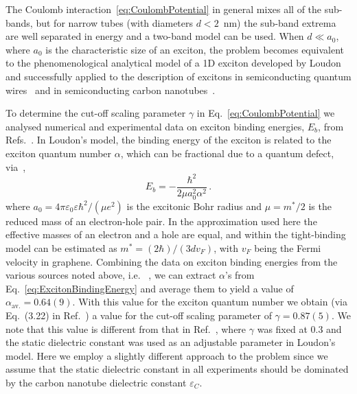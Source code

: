 \documentclass[journal=aamick,manuscript=article]{achemso}
\begin{document}
The Coulomb interaction~\eqref{eq:CoulombPotential} in general mixes all of the sub-bands, but for narrow tubes (with diameters $d<2$~nm) the sub-band extrema are well separated in energy and a two-band model can be used. When $ d \ll a_0$, where $a_0$ is the characteristic size of an exciton, the problem becomes equivalent to the phenomenological analytical model of a 1D exciton developed by Loudon~\cite{Loudon1959} and successfully applied to the description of excitons in semiconducting quantum wires~\cite{Banyai1987,Ogawa1991,Ogawa1991a} and in semiconducting carbon nanotubes~\cite{Wang2005}.

To determine the cut-off scaling parameter $\gamma$ in Eq.~\eqref{eq:CoulombPotential} we analysed numerical and experimental data on exciton binding energies, $E_b$, from Refs.~\cite{Zhao2004,Chang2004,Maultzsch2005,Pedersen2003}.
In Loudon's model, the binding energy of the exciton is related to the exciton quantum number $\alpha$, which can be fractional due to a quantum defect, via~\cite{Loudon1959},
%
\begin{equation}
\label{eq:ExcitonBindingEnergy}
    E_b =  -\dfrac{\hbar^2}{2 \mu a_0^2 \alpha^2} \, .
\end{equation}
%
where $a_0 =  4 \pi \varepsilon_0 \varepsilon \hbar^2/(\mu e^2)$ is the excitonic Bohr radius and $\mu=m^{\ast}/2$ is the reduced mass of an electron-hole pair.
In the approximation used here the effective masses of an electron and a hole are equal, and within the tight-binding model can be estimated as  $m^{\ast}=(2 \hbar)/(3 d v_F)$, with $v_F$ being the Fermi velocity in graphene.
Combining the data on exciton binding energies from the various sources noted above, i.e. ~\cite{Zhao2004,Chang2004,Maultzsch2005,Pedersen2003}, we can extract $\alpha$'s from Eq.~\eqref{eq:ExcitonBindingEnergy} and average them to yield a value of $\alpha_{\text{av.}} = 0.64(9)$.
With this value for the exciton quantum number we obtain (via Eq.~(3.22) in Ref.~\cite{Loudon1959}) a value for the cut-off scaling parameter of $\gamma = 0.87(5)$. 
We note that this value is different from that in Ref.~\cite{Wang2005}, where $\gamma$ was fixed at $0.3$ and the static dielectric constant was used as an adjustable parameter in Loudon's model.
Here we employ a slightly different approach to the problem since we assume that the static dielectric constant in all experiments should be dominated by the carbon nanotube dielectric constant $\varepsilon_C$.
\end{document}
